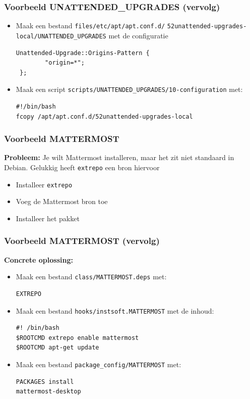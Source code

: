 \documentclass{beamer}
\begin{document}
\begin{frame}[fragile]
\frametitle{Voorbeeld UNATTENDED\_UPGRADES (vervolg)}
\begin{itemize}
  \item<2-> Maak een bestand \texttt{files/etc/apt/apt.conf.d/} \texttt{52unattended-upgrades-local/UNATTENDED\_UPGRADES} met de configuratie
  \begin{verbatim}Unattended-Upgrade::Origins-Pattern {
        "origin=*";
 };
  \end{verbatim}
  \item<3-> Maak een script \texttt{scripts/UNATTENDED\_UPGRADES/10-configuration} met:
  \begin{verbatim}#!/bin/bash
fcopy /apt/apt.conf.d/52unattended-upgrades-local
  \end{verbatim}
\end{itemize}
\end{frame}

\begin{frame}[fragile]
\frametitle{Voorbeeld MATTERMOST}
\textbf{Probleem:} 
Je wilt Mattermost installeren, maar het zit niet standaard in Debian. Gelukkig heeft \texttt{extrepo} een bron hiervoor

\begin{itemize}
  \item<3-> Installeer \texttt{extrepo}
  \item<4-> Voeg de Mattermost bron toe
  \item<5-> Installeer het pakket
\end{itemize}
\end{frame}
\begin{frame}[fragile]
\frametitle{Voorbeeld MATTERMOST (vervolg)}
\textbf{Concrete oplossing:}
\begin{itemize}
  \item<2-> Maak een bestand \texttt{class/MATTERMOST.deps} met:
  \begin{verbatim}EXTREPO
  \end{verbatim}
  \item<3-> Maak een bestand \texttt{hooks/instsoft.MATTERMOST} met de inhoud:
  \begin{verbatim}#! /bin/bash
$ROOTCMD extrepo enable mattermost
$ROOTCMD apt-get update
  \end{verbatim}
  \item<4-> Maak een bestand \texttt{package\_config/MATTERMOST} met:
  \begin{verbatim}PACKAGES install
mattermost-desktop
\end{verbatim} 
  \end{itemize}
\end{frame}
\end{document}
